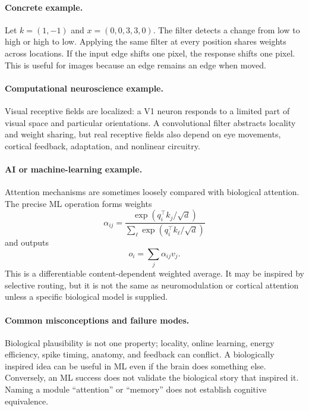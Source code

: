 \paragraph{Concrete example.}
Let \(k=(1,-1)\) and \(x=(0,0,3,3,0)\). The filter detects a change from low to high or high to low. Applying the same filter at every position shares weights across locations. If the input edge shifts one pixel, the response shifts one pixel. This is useful for images because an edge remains an edge when moved.

\paragraph{Computational neuroscience example.}
Visual receptive fields are localized: a V1 neuron responds to a limited part of visual space and particular orientations. A convolutional filter abstracts locality and weight sharing, but real receptive fields also depend on eye movements, cortical feedback, adaptation, and nonlinear circuitry.

\paragraph{AI or machine-learning example.}
Attention mechanisms are sometimes loosely compared with biological attention. The precise ML operation forms weights
\[
\alpha_{ij}=\frac{\exp(q_i^\top k_j/\sqrt d)}{\sum_\ell \exp(q_i^\top k_\ell/\sqrt d)}
\]
and outputs
\[
o_i=\sum_j \alpha_{ij}v_j.
\]
This is a differentiable content-dependent weighted average. It may be inspired by selective routing, but it is not the same as neuromodulation or cortical attention unless a specific biological model is supplied.

\paragraph{Common misconceptions and failure modes.}
Biological plausibility is not one property; locality, online learning, energy efficiency, spike timing, anatomy, and feedback can conflict. A biologically inspired idea can be useful in ML even if the brain does something else. Conversely, an ML success does not validate the biological story that inspired it. Naming a module ``attention'' or ``memory'' does not establish cognitive equivalence.

